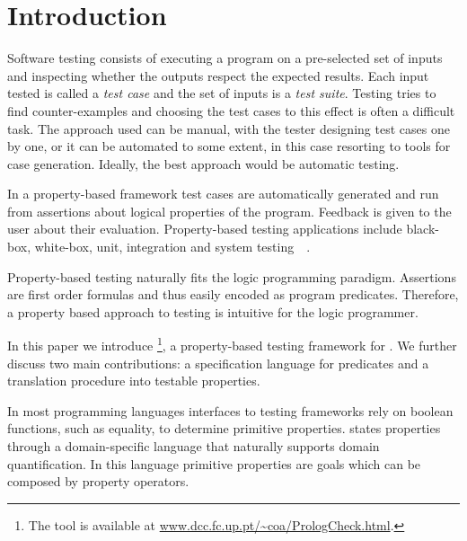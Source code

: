 
\section{Introduction}
\label{sec:intro}


Software testing consists of executing a program on
a pre-selected set of inputs and inspecting whether the outputs
respect the expected results.
%
Each input tested is called a \emph{test case} and the set of inputs is
a \emph{test suite}.
%
Testing tries to find counter-examples and choosing the test cases to
this effect is often a difficult task.
%
The approach used can be  manual, with the tester designing test cases
one by one, or it can be automated to some extent, in this case
resorting to tools for case generation.
%
Ideally, the best approach would be automatic testing.



In a property-based framework test cases are automatically generated and run
from assertions about logical properties of the program.
%
Feedback is given to the user about their evaluation.
%
Property-based testing applications include black-box, white-box, unit,
integration and system
testing~\cite{Boberg-model-based-testing-erl}~\cite{Claessen-ranking-prog-blackbox,Claessen-find-race-cond-erl}.




Property-based testing naturally fits the logic programming paradigm. 
%
Assertions are first order formulas and thus easily encoded as program predicates.
%
Therefore, a property based approach to testing
is intuitive for the
logic programmer.



In this paper we introduce \plqc{}\footnote{The \plqc{} tool is available at \url{www.dcc.fc.up.pt/~coa/PrologCheck.html}.},
a property-based testing framework for \Prolog{}.
%
We further discuss two main contributions: a specification language for \Prolog{} predicates
and a translation procedure into testable properties.



In most programming languages interfaces to testing frameworks rely
on boolean functions, such as equality, to determine primitive properties.
%
\plqc{} states properties through a domain-specific language that
naturally supports domain quantification.
%
In this language primitive properties are \Prolog{} goals which can be
composed by \plqc{} property operators. 




